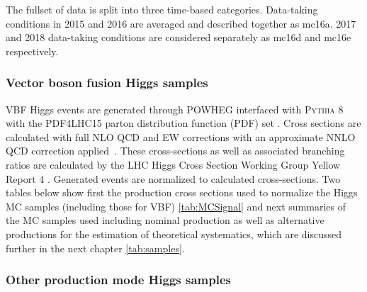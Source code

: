 
The fullset of data is split into three time-based categories. Data-taking conditions in 2015 and 2016 are averaged and described together as mc16a. 2017 and 2018 data-taking conditions are considered separately as mc16d and mc16e respectively. 

\subsubsection{Vector boson fusion Higgs samples}

VBF Higgs events are generated through \textsc{POWHEG} \cite{Nason:2009ai} interfaced with \textsc{Pythia} 8 with the PDF4LHC15 parton distribution function (PDF) set \cite{PDF4LHC15}. Cross sections are calculated with full NLO QCD and EW corrections \cite{CiccoliniDennerDittmaier2007,Arnold2009} with an approximate NNLO QCD correction applied~\cite{Bolzoni2010}. These cross-sections as well as associated branching ratios are calculated by the LHC Higgs Cross Section Working Group Yellow Report 4 \cite{deFlorian:2016spz}. Generated events are normalized to calculated cross-sections. Two tables below show first the production cross sections used to normalize the Higgs MC samples (including those for VBF) \ref{tab:MCSignal} and next summaries of the MC samples used including nominal production as well as alternative productions for the estimation of theoretical systematics, which are discussed further in the next chapter \ref{tab:samples}.  
\subsubsection{Other production mode Higgs samples}

